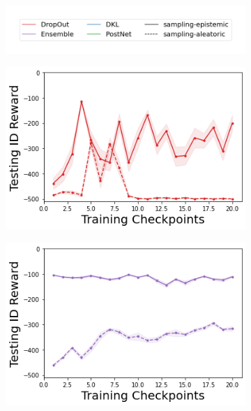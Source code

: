 \begin{figure}
    \centering
    \begin{subfigure}{.45\textwidth}
        \includegraphics[width=\textwidth]{sections/011_icml2022/resources/sampling-legend.png}
    \end{subfigure}
    \vspace{-3mm}
    
    \begin{subfigure}{.24\textwidth}
        \includegraphics[width=\textwidth]{sections/011_icml2022/resources/DropOut-Acrobot-v1-mean_reward_-testing-strategy.png}
    \end{subfigure}
    \begin{subfigure}{.24\textwidth}
        \includegraphics[width=\textwidth]{sections/011_icml2022/resources/Ensemble-Acrobot-v1-mean_reward_-testing-strategy.png}

\end{subfigure}
\end{figure}
